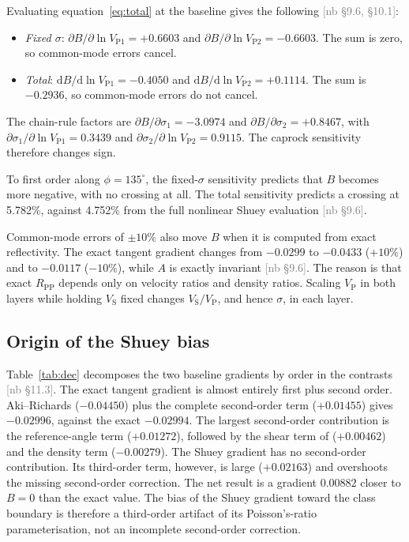 \documentclass[11pt]{article}
\newcommand{\VP}{V_\mathrm{P}}
\newcommand{\VS}{V_\mathrm{S}}
\newcommand{\RPP}{R_\mathrm{PP}}
\newif\ifshownb \shownbtrue
\newcommand{\nb}[1]{\ifshownb\textcolor{gray}{[nb #1]}\fi}
\begin{document}
Evaluating equation~\ref{eq:total} at the baseline gives the following \nb{\S9.6, \S10.1}:
\begin{itemize}
\item \emph{Fixed $\sigma$}: $\partial B/\partial\ln V_{\mathrm{P}1}=+0.6603$ and $\partial B/\partial\ln V_{\mathrm{P}2}=-0.6603$. The sum is zero, so common-mode errors cancel.
\item \emph{Total}: $\mathrm{d}B/\mathrm{d}\ln V_{\mathrm{P}1}=-0.4050$ and $\mathrm{d}B/\mathrm{d}\ln V_{\mathrm{P}2}=+0.1114$. The sum is $-0.2936$, so common-mode errors do not cancel.
\end{itemize}
The chain-rule factors are $\partial B/\partial\sigma_1=-3.0974$ and $\partial B/\partial\sigma_2=+0.8467$, with $\partial\sigma_1/\partial\ln V_{\mathrm{P}1}=0.3439$ and $\partial\sigma_2/\partial\ln V_{\mathrm{P}2}=0.9115$. The caprock sensitivity therefore changes sign.

To first order along $\phi=135^\circ$, the fixed-$\sigma$ sensitivity predicts that $B$ becomes more negative, with no crossing at all. The total sensitivity predicts a crossing at 5.782\%, against 4.752\% from the full nonlinear Shuey evaluation \nb{\S9.6}.

Common-mode errors of $\pm10\%$ also move $B$ when it is computed from exact reflectivity. The exact tangent gradient changes from $-0.0299$ to $-0.0433$ ($+10\%$) and to $-0.0117$ ($-10\%$), while $A$ is exactly invariant \nb{\S9.6}. The reason is that exact $\RPP$ depends only on velocity ratios and density ratios. Scaling $\VP$ in both layers while holding $\VS$ fixed changes $\VS/\VP$, and hence $\sigma$, in each layer.

\subsection*{Origin of the Shuey bias}

Table~\ref{tab:dec} decomposes the two baseline gradients by order in the contrasts \nb{\S11.3}. The exact tangent gradient is almost entirely first plus second order. Aki--Richards ($-0.04450$) plus the complete second-order term ($+0.01455$) gives $-0.02996$, against the exact $-0.02994$. The largest second-order contribution is the reference-angle term ($+0.01272$), followed by the shear term of \citet{wang1999} ($+0.00462$) and the density term ($-0.00279$). The Shuey gradient has no second-order contribution. Its third-order term, however, is large ($+0.02163$) and overshoots the missing second-order correction. The net result is a gradient $0.00882$ closer to $B=0$ than the exact value. The bias of the Shuey gradient toward the class boundary is therefore a third-order artifact of its Poisson's-ratio parameterisation, not an incomplete second-order correction.
\end{document}
